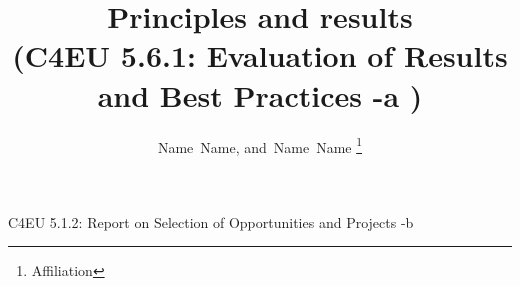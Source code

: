 \documentclass[draftclsnofoot,12pt,journal,onecolumn]{IEEEtran}
\begin{document}
%
\title{Principles and results \\ (C4EU 5.6.1: Evaluation of Results and Best Practices -a )}
%
%
%

\author{
	Name~Name, %
    and~Name~Name%
\thanks{
Affiliation
}
}


% 
%



%
{C4EU 5.1.2: Report on Selection of Opportunities and Projects -b}
% 
\end{document}

